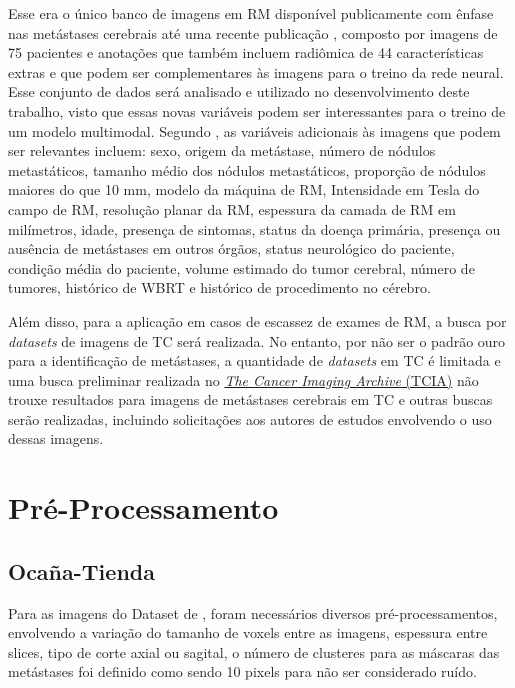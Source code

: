 Esse era o único banco de imagens em RM disponível publicamente com ênfase nas metástases cerebrais até uma recente publicação \cite{Ocaña-Tienda:2023}, composto por imagens de 75 pacientes e anotações que também incluem radiômica de 44 características extras e que podem ser complementares às imagens para o treino da rede neural. Esse conjunto de dados será analisado e utilizado no desenvolvimento deste trabalho, visto que essas novas variáveis podem ser interessantes para o treino de um modelo multimodal. Segundo \cite{Niranjan:2019,Cho:2020,Grovik:2020}, as variáveis adicionais às imagens que podem ser relevantes incluem: sexo, origem da metástase, número de nódulos metastáticos, tamanho médio dos nódulos metastáticos, proporção de nódulos maiores do que 10 mm, modelo da máquina de RM, Intensidade em Tesla do campo de RM, resolução planar da RM, espessura da camada de RM em milímetros, idade, presença de sintomas, status da doença primária, presença ou ausência de metástases em outros órgãos, status neurológico do paciente, condição média do paciente, volume estimado do tumor cerebral, número de tumores, histórico de WBRT e histórico de procedimento no cérebro.

Além disso, para a aplicação em casos de escassez de exames de RM, a busca por \textit{datasets} de imagens de TC será realizada. No entanto, por não ser o padrão ouro para a identificação de metástases, a quantidade de \textit{datasets} em TC é limitada e uma busca preliminar realizada no \href{https://www.cancerimagingarchive.net/collections/}{\textit{The Cancer Imaging Archive} (TCIA)} não trouxe resultados para imagens de metástases cerebrais em TC e outras buscas serão realizadas, incluindo solicitações aos autores de estudos envolvendo o uso dessas imagens.

\section{Pré-Processamento}

\subsection{Ocaña-Tienda}
Para as imagens do Dataset de \cite{Ocaña-Tienda:2023}, foram necessários diversos pré-processamentos, envolvendo a variação do tamanho de voxels entre as imagens, espessura entre slices, tipo de corte axial ou sagital, o número de clusteres para as máscaras das metástases foi definido como sendo 10 pixels para não ser considerado ruído.

